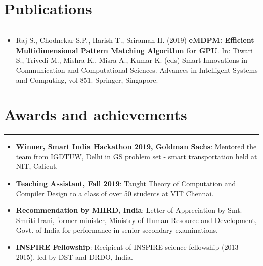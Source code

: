 \documentclass[a4paper,6pt]{article}
\begin{document}
\section*{Publications}
\vspace{-8px}
\hrule
\vspace{8px}
\begin{itemize}
	\item \small Raj S., Chodnekar S.P., Harish T., Sriraman H. (2019) \textcolor{mygray}{\textbf{eMDPM: Efficient Multidimensional Pattern Matching Algorithm for GPU}}. In: Tiwari S., Trivedi M., Mishra K., Misra A., Kumar K. (eds) Smart Innovations in Communication and Computational Sciences. Advances in Intelligent Systems and Computing, vol 851. Springer, Singapore. 
\normalsize
\end{itemize}


\section*{Awards and achievements}
\vspace{-8px}
\hrule
\vspace{8px}
\begin{itemize}
	\item \textbf{Winner, Smart India Hackathon 2019, Goldman Sachs}: \small Mentored the team from IGDTUW, Delhi in GS problem set - smart transportation held at NIT, Calicut.
\normalsize
\vspace{2px}
	\item \textbf{Teaching Assistant, Fall 2019}: \small Taught Theory of Computation and Compiler Design to a class of over 50 students at VIT Chennai. 
\normalsize
\vspace{2px}
    \item \textbf{Recommendation by MHRD, India}: \small Letter of Appreciation by Smt. Smriti Irani, former minister, Ministry of Human Resource and Development, Govt. of India for performance in senior secondary examinations.
\normalsize
\vspace{2px}
	\item \textbf{INSPIRE Fellowship}: \small Recipient of INSPIRE science fellowship (2013-2015), led by DST and DRDO, India.
\normalsize
\end{itemize}
\end{document}
